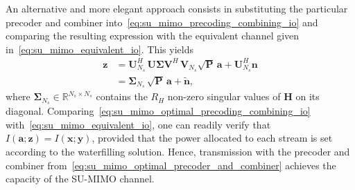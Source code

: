An alternative and more elegant approach consists in substituting the particular precoder and combiner into~\eqref{eq:su_mimo_precoding_combining_io} and comparing the resulting expression with the equivalent channel given in~\eqref{eq:su_mimo_equivalent_io}.
This yields
\begin{subequations}
\label{eq:su_mimo_optimal_precoding_combining_io}
\begin{align}
    \mathbf{z} &= \mathbf{U}_{N_s}^H \, \mathbf{U} \mathbf{\Sigma} \mathbf{V}^H \, \mathbf{V}_{N_s} \sqrt{\mathbf{P}} \, \mathbf{a} + \mathbf{U}_{N_s}^H \mathbf{n} \\
    &= \mathbf{\Sigma}_{N_s} \, \sqrt{\mathbf{P}} \, \mathbf{a} + \tilde{\mathbf{n}},
\end{align}
\end{subequations}
where $\mathbf{\Sigma}_{N_s} \in \mathbb{R}^{N_s \times N_s}$ contains the $R_H$ non-zero singular values of $\mathbf{H}$ on its diagonal.
Comparing~\eqref{eq:su_mimo_optimal_precoding_combining_io} with~\eqref{eq:su_mimo_equivalent_io}, one can readily verify that $I(\mathbf{a}; \mathbf{z}) = I(\mathbf{x}; \mathbf{y})$, provided that the power allocated to each stream is set according to the waterfilling solution.
Hence, transmission with the precoder and combiner from~\eqref{eq:su_mimo_optimal_precoder_and_combiner} achieves the capacity of the \ac{SU}-\ac{MIMO} channel.
\bigskip

